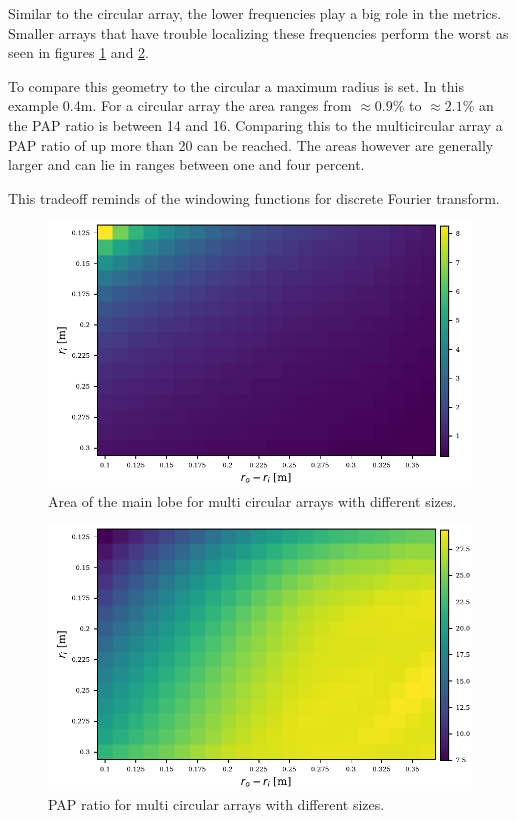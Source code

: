 Similar to the circular array, the lower frequencies play a big role in the metrics.
Smaller arrays that have trouble localizing these frequencies perform the worst as seen
in figures \ref*{aev:fig:FancyArea} and \ref*{aev:fig:FancyPap}.

To compare this geometry to the circular a maximum radius is set.
In this example 0.4m. 
For a circular array the area ranges from $\approx 0.9\%$ to 
$\approx 2.1\%$ an the PAP ratio is between 14 and 16.
Comparing this to the multicircular array a PAP ratio of up
more than 20 can be reached. 
The areas however are generally larger and can lie in ranges 
between one and four percent.

This tradeoff reminds of the windowing functions for discrete
Fourier transform. 
\begin{figure}[h]
	\centering
	\includegraphics[]{images/5_array_evaluation/fancy_area.pdf}
	\caption{Area of the main lobe for multi circular arrays with different
		sizes.}
	\label{aev:fig:FancyArea}
\end{figure}
\begin{figure}
	\centering
	\includegraphics[]{images/5_array_evaluation/fancy_pap.pdf}
	\caption{PAP ratio for multi circular arrays with different
		sizes.}
	\label{aev:fig:FancyPap}
\end{figure}

